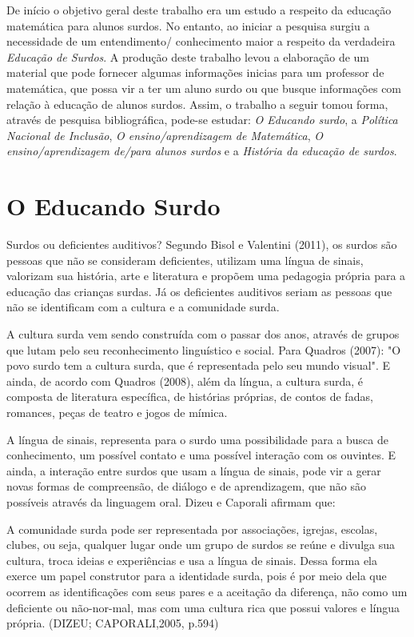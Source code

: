 \documentclass[brasil]{abnt}
\begin{document}
	De início o objetivo geral deste trabalho era um estudo a respeito da educação matemática para alunos surdos. No entanto, ao iniciar a pesquisa surgiu a necessidade de um entendimento/ conhecimento
	maior a respeito da verdadeira \textit{Educação de Surdos}. A produção deste trabalho levou a elaboração de um material que pode fornecer algumas informações inicias para um professor de matemática, 
	que possa vir a ter um aluno surdo ou que busque informações com relação à educação de alunos surdos. Assim, o trabalho a seguir tomou forma, através de pesquisa bibliográfica, pode-se estudar: 
	\textit{O Educando surdo}, a \textit{Política Nacional de Inclusão}, \textit{O ensino/aprendizagem de Matemática}, \textit{O ensino/aprendizagem de/para alunos surdos} e a \textit{História da educação 
	de surdos}.


\chapter{O Educando Surdo}
		Surdos ou deficientes auditivos? Segundo Bisol e Valentini (2011), os surdos são pessoas que não se consideram deficientes, utilizam uma língua de sinais, valorizam sua história, arte e literatura 
		e propõem uma pedagogia própria para a educação das crianças surdas. Já os deficientes auditivos seriam as pessoas que não se identificam com a cultura e a comunidade surda. 
				
		A cultura surda vem sendo construída com o passar dos anos, através de grupos que lutam pelo seu reconhecimento linguístico e social. 
		Para Quadros (2007): "O povo surdo tem a cultura surda, que é representada pelo seu mundo visual". E ainda, de acordo com Quadros (2008), além da língua, a cultura surda, é composta de literatura 
		específica, de histórias próprias, de contos de fadas, romances, peças de teatro e jogos de mímica.
		
		
		A língua de sinais, representa para o surdo uma possibilidade para a busca de conhecimento, um possível contato e uma possível interação com os ouvintes.
		E ainda, a interação entre surdos que usam a língua de sinais, pode vir a gerar novas formas de compreensão, de diálogo e de aprendizagem, que não são possíveis através da linguagem oral.
		Dizeu e Caporali afirmam que:
		
			\begin{citacao}A comunidade surda pode ser representada por associações, igrejas, escolas, clubes, ou seja, qualquer lugar onde um grupo de surdos se reúne e divulga sua cultura, troca ideias e 
							experiências e usa a língua de sinais. Dessa forma ela exerce um papel construtor para a identidade surda, pois é por meio dela que ocorrem as identificações com seus pares e a 
							aceitação da diferença, não como um deficiente ou não-nor-mal, mas com uma cultura rica que possui valores e língua própria. (DIZEU; CAPORALI,2005, p.594)
			\end{citacao}
			
\end{document}
